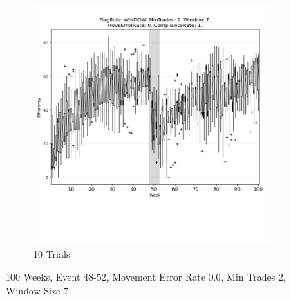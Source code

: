 \documentclass{article}%
\begin{document}
\begin{figure}[!htb]
\begin{subfigure}[b]{0.45\linewidth}
\includegraphics[clip,width=\linewidth,trim=0 4cm 0 0]{0052fr_WINDOW_mt_2_ws_7_er_0_cr_1_t10.png}%
\caption{10 Trials}%
\end{subfigure}%
\caption{100 Weeks, Event 48{-}52, Movement Error Rate 0.0, Min Trades 2, Window Size 7}%
\end{figure}

%
\end{document}
